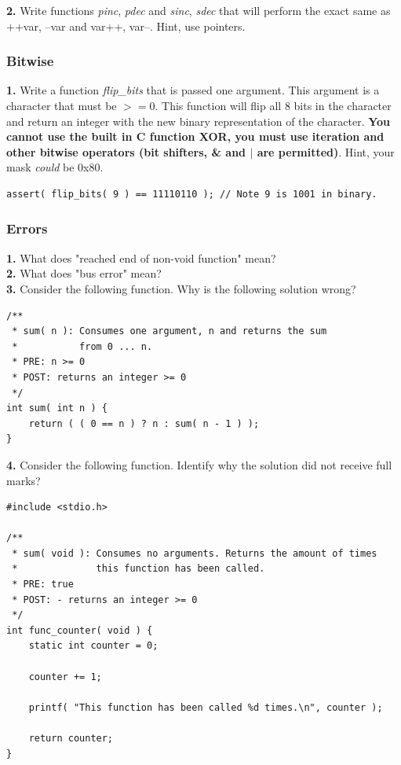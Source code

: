 \documentclass[12pt,extarticle]{article}
\begin{document}
\noindent
\textbf{2.} Write functions \emph{pinc}, \emph{pdec} and \emph{sinc}, \emph{sdec} that will perform the exact same as ++var, --var and var++, var--. Hint, use pointers.

\subsubsection{Bitwise}

\textbf{1.} Write a function \emph{flip\_bits} that is passed one argument. This argument is a character that must be $>= 0$. This function will flip all 8 bits in the character and return an integer with the new binary representation of the character. \textbf{You cannot use the built in C function XOR, you must use iteration and other bitwise operators (bit shifters, \& and $|$ are permitted)}. Hint, your mask \emph{could} be 0x80.\\

\lstset {
	language=c
}
\begin{lstlisting}
assert( flip_bits( 9 ) == 11110110 ); // Note 9 is 1001 in binary.
\end{lstlisting}

\subsubsection{Errors}

\textbf{1.} What does "reached end of non-void function" mean?\\

\noindent
\textbf{2.} What does "bus error" mean?\\

\noindent
\textbf{3.} Consider the following function. Why is the following solution wrong?\\

\lstset {
	language=c
}
\begin{lstlisting}
/**
 * sum( n ): Consumes one argument, n and returns the sum
 *           from 0 ... n.
 * PRE: n >= 0
 * POST: returns an integer >= 0
 */
int sum( int n ) {
	return ( ( 0 == n ) ? n : sum( n - 1 ) );
}
\end{lstlisting}

\noindent
\textbf{4.} Consider the following function. Identify why the solution did not receive full marks?\\

\lstset {
	language=c
}
\begin{lstlisting}
#include <stdio.h>

/**
 * sum( void ): Consumes no arguments. Returns the amount of times
 *              this function has been called.
 * PRE: true
 * POST: - returns an integer >= 0
 */
int func_counter( void ) {
	static int counter = 0;
	
	counter += 1;	
	
	printf( "This function has been called %d times.\n", counter );
	
	return counter;
}
\end{lstlisting}
\end{document}
